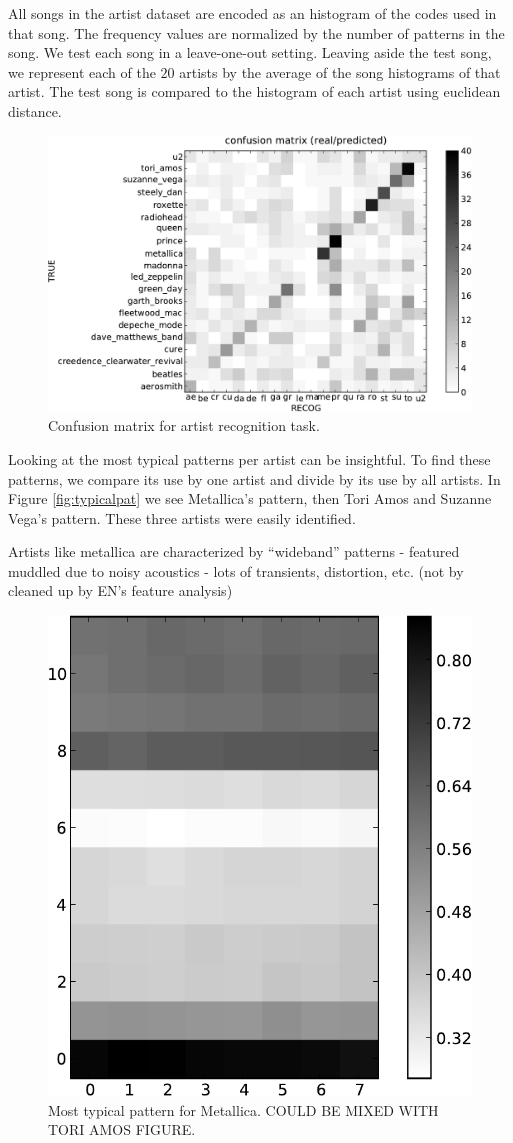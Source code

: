 \documentclass{article}
\begin{document}
All songs in the artist dataset are encoded as an histogram of the codes
used in that song. The frequency values are normalized by the number
of patterns in the song. We test each song in a leave-one-out setting.
Leaving aside the test song, we represent each of the $20$ artists by the 
average of
the song histograms of that artist. The test song is compared to
the histogram of each artist using euclidean distance.


\begin{figure}[htb]
\includegraphics[width=.9\columnwidth]{conf_mat_per_artist}
\caption{\small{Confusion matrix for artist recognition task.}}
\label{fig:conf_mat}
\end{figure}

Looking at the most typical patterns per artist can be insightful.
To find these patterns, we compare its use by one artist and divide
by its use by all artists. In Figure \ref{fig:typicalpat} we see 
Metallica's pattern, then Tori Amos and
Suzanne Vega's pattern. These three artists were easily identified.

Artists like metallica are characterized by ``wideband'' patterns -
featured muddled due to noisy acoustics - lots of transients,
distortion, etc.  (not by cleaned up by EN's feature analysis)

\iffalse
\begin{figure}[htb]
\begin{center}
\includegraphics[width=.4\columnwidth]{metallica_pattern}
\end{center}
\caption{\small{Most typical pattern for Metallica.
COULD BE MIXED WITH TORI AMOS FIGURE.
}}
\label{fig:metallica}
\end{figure}
\end{document}
